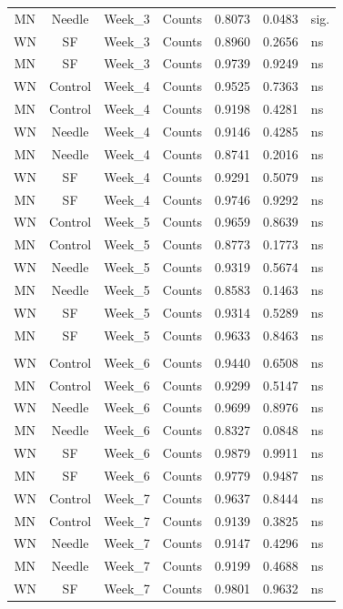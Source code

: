 \documentclass[
  12pt,
  letterpaper,
]{article}
\begin{document}
\begin{longtable}{ccclrrl}
MN & Needle & Week\_3 & Counts & 0.8073 & 0.0483 & sig. \\ 
WN & SF & Week\_3 & Counts & 0.8960 & 0.2656 & ns \\ 
MN & SF & Week\_3 & Counts & 0.9739 & 0.9249 & ns \\ 
WN & Control & Week\_4 & Counts & 0.9525 & 0.7363 & ns \\ 
MN & Control & Week\_4 & Counts & 0.9198 & 0.4281 & ns \\ 
WN & Needle & Week\_4 & Counts & 0.9146 & 0.4285 & ns \\ 
MN & Needle & Week\_4 & Counts & 0.8741 & 0.2016 & ns \\ 
WN & SF & Week\_4 & Counts & 0.9291 & 0.5079 & ns \\ 
MN & SF & Week\_4 & Counts & 0.9746 & 0.9292 & ns \\ 
WN & Control & Week\_5 & Counts & 0.9659 & 0.8639 & ns \\ 
MN & Control & Week\_5 & Counts & 0.8773 & 0.1773 & ns \\ 
WN & Needle & Week\_5 & Counts & 0.9319 & 0.5674 & ns \\ 
MN & Needle & Week\_5 & Counts & 0.8583 & 0.1463 & ns \\ 
WN & SF & Week\_5 & Counts & 0.9314 & 0.5289 & ns \\ 
MN & SF & Week\_5 & Counts & 0.9633 & 0.8463 & ns \\ 
\midrule\addlinespace[2.5pt]
\multicolumn{7}{l}{Post-Infestion} \\[2.5pt] 
\midrule\addlinespace[2.5pt]
WN & Control & Week\_6 & Counts & 0.9440 & 0.6508 & ns \\ 
MN & Control & Week\_6 & Counts & 0.9299 & 0.5147 & ns \\ 
WN & Needle & Week\_6 & Counts & 0.9699 & 0.8976 & ns \\ 
MN & Needle & Week\_6 & Counts & 0.8327 & 0.0848 & ns \\ 
WN & SF & Week\_6 & Counts & 0.9879 & 0.9911 & ns \\ 
MN & SF & Week\_6 & Counts & 0.9779 & 0.9487 & ns \\ 
WN & Control & Week\_7 & Counts & 0.9637 & 0.8444 & ns \\ 
MN & Control & Week\_7 & Counts & 0.9139 & 0.3825 & ns \\ 
WN & Needle & Week\_7 & Counts & 0.9147 & 0.4296 & ns \\ 
MN & Needle & Week\_7 & Counts & 0.9199 & 0.4688 & ns \\ 
WN & SF & Week\_7 & Counts & 0.9801 & 0.9632 & ns \\ 

\end{longtable}
\end{document}
